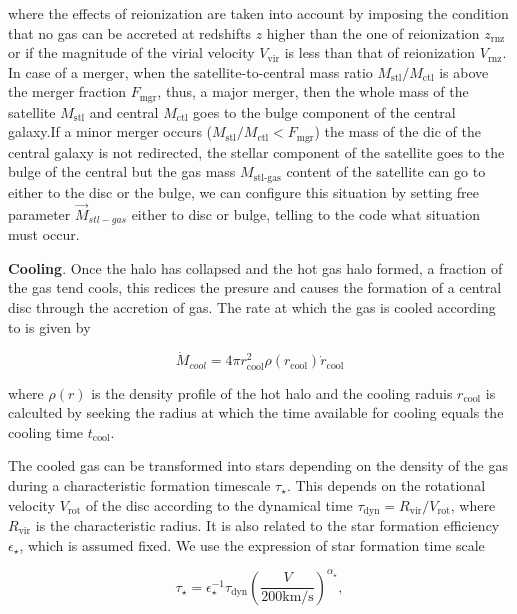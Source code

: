 \documentclass[usenatbib]{mn2e}
\begin{document}
where the effects of reionization are taken into account by  imposing
the condition that no gas can be accreted at  redshifts $z$ higher
than the one of  reionization $z_{\text{rnz}}$ or if the magnitude of
the virial velocity $V_{\text{vir}}$ is less than that of reionization
$V_{\text{rnz}}$.  In case of a merger, when the satellite-to-central
mass ratio $M_{\text{stl}}/M_{\text{ctl}}$ is above the merger
fraction $F_{\text{mgr}}$, thus, a major merger, then the whole mass
of the satellite $M_{\text{stl}}$ and central $M_{\text{ctl}}$ goes to
the bulge component of the central galaxy.If a minor merger occurs
($M_{\text{stl}}/M_{\text{ctl}}<F_{\text{mgr}}$) the mass of the dic
of the central galaxy is not redirected, the stellar component of the
satellite goes to the bulge of the central but the gas mass
$M_{\text{stl-gas}}$ content  of the satellite can go to either to the
disc or the bulge, we can configure this situation by setting free
parameter $\vec{M}_{stl-gas}$ either to disc or bulge, telling to the
code what situation must occur. 

\textbf{Cooling}. Once the halo has collapsed and the hot gas halo
formed, a fraction of the gas tend cools, this redices the presure and
causes the formation of a central disc through the accretion of
gas. The rate at which the gas is cooled according to
\cite{1991ApJ...379...52W} is given by 

\begin{equation}
 \dot{M}_{cool}=4\pi r^2_{\text{cool}} \rho (r_{\text{cool}}) \dot{r}_{\text{cool}}
\end{equation}

where  $\rho(r)$ is the density profile of the hot halo and the
cooling raduis $r_{\text{cool}}$ is calculted by seeking the radius at
which the  time available for cooling equals the cooling time
$t_{\text{cool}}$.  




The cooled gas can be  transformed into stars depending on the density
of the gas during a characteristic formation timescale
$\tau_{\star}$. This depends on the rotational velocity
$V_{\text{rot}}$ of the disc according to the dynamical time
$\tau_{\text{dyn}}=R_{\text{vir}}/V_{\text{rot}}$, where
$R_{\text{vir}}$ is the characteristic radius. It is also related to
the star formation efficiency $\epsilon_{\star}$, which is assumed
fixed. We use the expression of star formation time scale

\begin{equation}
 \tau_{\star} = \epsilon^{-1}_{\star}\tau_{\text{dyn}}\left( \frac{V}{200\text{km/s}}\right)^{\alpha_\star},
\end{equation}
\end{document}
